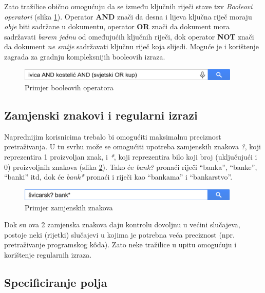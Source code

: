 \documentclass[a4paper,twoside,12pt]{scrreprt}
\begin{document}
Zato tražilice obično omogućuju da se između ključnih riječi stave tzv \textit{Booleovi operatori} (slika \ref{boolean}). Operator \textbf{AND} znači da desna i lijeva ključna riječ moraju \textit{obje} biti sadržane u dokumentu, operator \textbf{OR} znači da dokument mora sadržavati \textit{barem jednu} od omeđujućih ključnih riječi, dok operator \textbf{NOT} znači da dokument \textit{ne smije} sadržavati ključnu riječ koja slijedi. Moguće je i korištenje zagrada za gradnju kompleksnijih booleovih izraza.

\begin{figure}[H]
  \centering
  \includegraphics[width=300pt]{boolean}
  \caption{Primjer booleovih operatora}
  \label{boolean}
\end{figure}

\subsection{Zamjenski znakovi i regularni izrazi}

Naprednijim korisnicima trebalo bi omogućiti maksimalnu preciznost pretraživanja. U tu svrhu može se omogućiti upotreba zamjenskih znakova \textit{?}, koji reprezentira 1 proizvoljan znak, i \textit{*}, koji reprezentira bilo koji broj (uključujući i 0) proizvoljnih znakova (slika \ref{wildcards}). Tako će \textit{bank?} pronaći riječi ``banka'', ``banke'', ``banki'' itd, dok će \textit{bank*} pronaći i riječi kao ``bankama'' i ``bankarstvo''.

\begin{figure}[H]
  \centering
  \includegraphics[width=300pt]{wildcards}
  \caption{Primjer zamjenskih znakova}
  \label{wildcards}
\end{figure}

Dok su ova 2 zamjenska znakova daju kontrolu dovoljnu u većini slučajeva, postoje neki (rijetki) slučajevi u kojima je potrebna veća preciznost (npr. pretraživanje programskog kôda). Zato neke tražilice u upitu omogućuju i korištenje regularnih izraza.

\subsection{Specificiranje polja}
\end{document}
